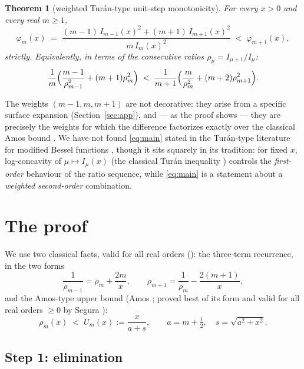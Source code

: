 \documentclass[11pt]{article}
\newtheorem{theorem}{Theorem}
\theoremstyle{remark}
\begin{document}
\begin{theorem}[weighted Tur\'an-type unit-step monotonicity]
\label{thm:main}
For every $x > 0$ and every real $m \ge 1$,
\begin{equation}
\label{eq:main}
\varphi_m(x) \;=\;
\frac{(m-1)\,I_{m-1}(x)^2 + (m+1)\,I_{m+1}(x)^2}{m\,I_m(x)^2}
\;<\; \varphi_{m+1}(x),
\end{equation}
strictly. Equivalently, in terms of the consecutive ratios
$\rho_\mu = I_{\mu+1}/I_\mu$:
\[
\frac1m\Bigl(\frac{m-1}{\rho_{m-1}^2} + (m+1)\rho_m^2\Bigr)
\;<\;
\frac1{m+1}\Bigl(\frac{m}{\rho_m^2} + (m+2)\rho_{m+1}^2\Bigr).
\]
\end{theorem}

The weights $(m-1, m, m+1)$ are not decorative: they arise from a
specific surface expansion (Section~\ref{sec:app}), and --- as the
proof shows --- they are precisely the weights for which the
difference factorizes exactly over the classical Amos bound
\cite{Amos, Segura2011, RuizSegura}. We have not found
\eqref{eq:main} stated in the Tur\'an-type literature for modified
Bessel functions \cite{TN, Baricz1010, BariczTuranians}, though it
sits squarely in its tradition: for fixed $x$, log-concavity of
$\mu \mapsto I_\mu(x)$ (the classical Tur\'an inequality
\cite{TN, Baricz1010}) controls the \emph{first-order} behaviour of
the ratio sequence, while \eqref{eq:main} is a statement about a
\emph{weighted second-order} combination.

\section{The proof}

We use two classical facts, valid for all real orders
(\cite[10.29.1]{DLMF}): the three-term recurrence, in the two forms
\begin{equation}
\label{eq:rec}
\frac{1}{\rho_{m-1}} = \rho_m + \frac{2m}{x},
\qquad
\rho_{m+1} = \frac{1}{\rho_m} - \frac{2(m+1)}{x},
\end{equation}
and the Amos-type upper bound (Amos \cite{Amos}; proved best of its
form and valid for all real orders $\ge 0$ by Segura
\cite{Segura2011, RuizSegura}):
\begin{equation}
\label{eq:amos}
\rho_m(x) \;<\; U_m(x) := \frac{x}{a + s},
\qquad a = m + \tfrac12,\quad s = \sqrt{a^2 + x^2}.
\end{equation}

\subsection*{Step 1: elimination}
\end{document}

